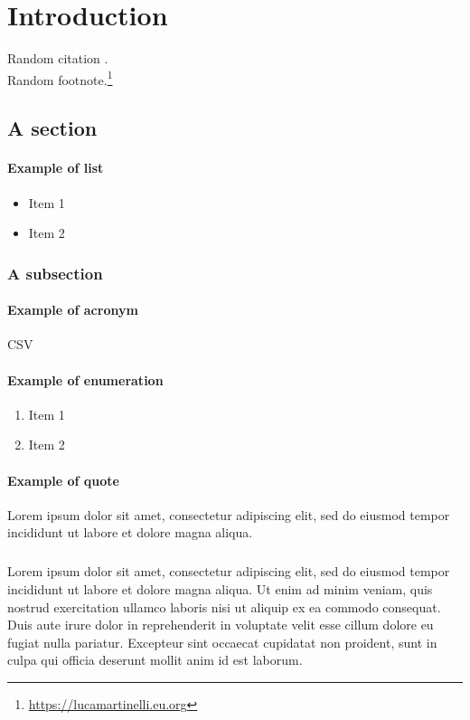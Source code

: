 
\chapter{Introduction}
\label{chp:intro}

Random citation \cite{russo_enhancing_nodate}. \\
Random footnote.\footnote{\url{https://lucamartinelli.eu.org}}

\section{A section}

\subsubsection{Example of list}
\begin{itemize}
  \item Item 1
  \item Item 2
\end{itemize}

\subsection{A subsection}

\subsubsection{Example of acronym}
\ac{CSV}

\subsubsection{Example of enumeration}
\begin{enumerate}
  \item Item 1
  \item Item 2
\end{enumerate}

\subsubsection{Example of quote}
\begin{displayquote}
Lorem ipsum dolor sit amet, consectetur adipiscing elit, sed do eiusmod tempor incididunt ut labore et dolore magna aliqua.
\end{displayquote}

\paragraph{}
Lorem ipsum dolor sit amet, consectetur adipiscing elit, sed do eiusmod tempor incididunt ut labore et dolore magna aliqua. Ut enim ad minim veniam, quis nostrud exercitation ullamco laboris nisi ut aliquip ex ea commodo consequat. Duis aute irure dolor in reprehenderit in voluptate velit esse cillum dolore eu fugiat nulla pariatur. Excepteur sint occaecat cupidatat non proident, sunt in culpa qui officia deserunt mollit anim id est laborum.